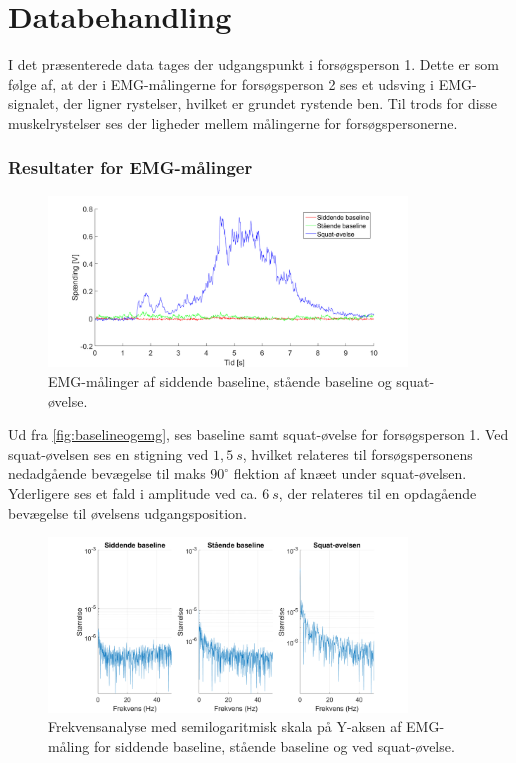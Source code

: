 \section{Databehandling}
I det præsenterede data tages der udgangspunkt i forsøgsperson 1. Dette er som følge af, at der i EMG-målingerne for forsøgsperson 2 ses et udsving i EMG-signalet, der ligner rystelser, hvilket er grundet rystende ben. Til trods for disse muskelrystelser ses der ligheder mellem målingerne for forsøgspersonerne. 

\subsubsection{Resultater for EMG-målinger}

\begin{figure}[H]
	\centering
	\includegraphics[width=0.85\textwidth]{figures/Pilotforsoeg/baselineogemg.png}
	\caption{EMG-målinger af siddende baseline, stående baseline og squat-øvelse.}
	\label{fig:baselineogemg}
\end{figure}
Ud fra \autoref{fig:baselineogemg}, ses baseline samt squat-øvelse for forsøgsperson 1. Ved squat-øvelsen ses en stigning ved $1,5~s$, hvilket relateres til forsøgspersonens nedadgående bevægelse til maks $90^{\circ}$ flektion af knæet under squat-øvelsen. Yderligere ses et fald i amplitude ved ca. $6~s$, der relateres til en opdagående bevægelse til øvelsens udgangsposition. 


\begin{figure}[H]
	\centering
	\includegraphics[width=0.85\textwidth]{figures/Pilotforsoeg/emgfft.png}
	\caption{Frekvensanalyse med semilogaritmisk skala på Y-aksen af EMG-måling for siddende baseline, stående baseline og ved squat-øvelse.}
	\label{fig:emgfft}
\end{figure}

